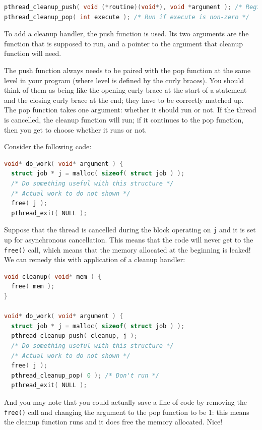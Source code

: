 \begin{lstlisting}[language=C]
pthread_cleanup_push( void (*routine)(void*), void *argument ); /* Register cleanup handler, with argument */ 
pthread_cleanup_pop( int execute ); /* Run if execute is non-zero */ 
\end{lstlisting}

To add a cleanup handler, the push function is used. Its two arguments are the function that is supposed to run, and a pointer to the argument that cleanup function will need.

The push function always needs to be paired with the pop function at the same level in your program (where level is defined by the curly braces). You should think of them as being like the opening curly brace at the start of a statement and the closing curly brace at the end; they have to be correctly matched up. The pop function takes one argument: whether it should run or not. If the thread is cancelled, the cleanup function will run; if it continues to the pop function, then you get to choose whether it runs or not.

Consider the following code:
\begin{lstlisting}[language=C]
void* do_work( void* argument ) {
  struct job * j = malloc( sizeof( struct job ) );
  /* Do something useful with this structure */
  /* Actual work to do not shown */
  free( j );
  pthread_exit( NULL );
\end{lstlisting}

Suppose that the thread is cancelled during the block operating on \texttt{j} and it is set up for asynchronous cancellation. This means that the code will never get to the \texttt{free()} call, which means that the memory allocated at the beginning is leaked! We can remedy this with application of a cleanup handler:
\begin{lstlisting}[language=C]
void cleanup( void* mem ) {
  free( mem );
}

void* do_work( void* argument ) {
  struct job * j = malloc( sizeof( struct job ) );
  pthread_cleanup_push( cleanup, j );
  /* Do something useful with this structure */
  /* Actual work to do not shown */
  free( j );
  pthread_cleanup_pop( 0 ); /* Don't run */
  pthread_exit( NULL );
\end{lstlisting}

And you may note that you could actually save a line of code by removing the \texttt{free()} call and changing the argument to the pop function to be 1: this means the cleanup function runs and it does free the memory allocated. Nice!


